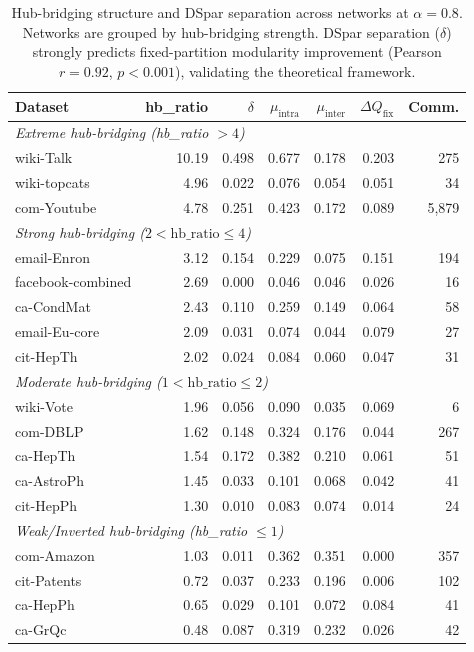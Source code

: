 \documentclass[10pt,journal,compsoc]{IEEEtran}
\begin{document}
\begin{table}[t]
\centering
\caption{Hub-bridging structure and DSpar separation across networks at $\alpha=0.8$. 
Networks are grouped by hub-bridging strength. 
DSpar separation ($\delta$) strongly predicts fixed-partition modularity improvement 
(Pearson $r = 0.92$, $p < 0.001$), validating the theoretical framework.}
\label{tab:hub_bridge_validation}
\begin{tabular}{lrrrrrr}
\toprule
Dataset & hb\_ratio & $\delta$ & $\mu_{\text{intra}}$ & $\mu_{\text{inter}}$ & $\Delta Q_{\text{fix}}$ & Comm. \\
\midrule
\multicolumn{7}{l}{\textit{Extreme hub-bridging (hb\_ratio $> 4$)}} \\
wiki-Talk & 10.19 & 0.498 & 0.677 & 0.178 & 0.203 & 275 \\
wiki-topcats & 4.96 & 0.022 & 0.076 & 0.054 & 0.051 & 34 \\
com-Youtube & 4.78 & 0.251 & 0.423 & 0.172 & 0.089 & 5,879 \\
\midrule
\multicolumn{7}{l}{\textit{Strong hub-bridging ($2 < \text{hb\_ratio} \leq 4$)}} \\
email-Enron & 3.12 & 0.154 & 0.229 & 0.075 & 0.151 & 194 \\
facebook-combined & 2.69 & 0.000 & 0.046 & 0.046 & 0.026 & 16 \\
ca-CondMat & 2.43 & 0.110 & 0.259 & 0.149 & 0.064 & 58 \\
email-Eu-core & 2.09 & 0.031 & 0.074 & 0.044 & 0.079 & 27 \\
cit-HepTh & 2.02 & 0.024 & 0.084 & 0.060 & 0.047 & 31 \\
\midrule
\multicolumn{7}{l}{\textit{Moderate hub-bridging ($1 < \text{hb\_ratio} \leq 2$)}} \\
wiki-Vote & 1.96 & 0.056 & 0.090 & 0.035 & 0.069 & 6 \\
com-DBLP & 1.62 & 0.148 & 0.324 & 0.176 & 0.044 & 267 \\
ca-HepTh & 1.54 & 0.172 & 0.382 & 0.210 & 0.061 & 51 \\
ca-AstroPh & 1.45 & 0.033 & 0.101 & 0.068 & 0.042 & 41 \\
cit-HepPh & 1.30 & 0.010 & 0.083 & 0.074 & 0.014 & 24 \\
\midrule
\multicolumn{7}{l}{\textit{Weak/Inverted hub-bridging (hb\_ratio $\leq 1$)}} \\
com-Amazon & 1.03 & 0.011 & 0.362 & 0.351 & 0.000 & 357 \\
cit-Patents & 0.72 & 0.037 & 0.233 & 0.196 & 0.006 & 102 \\
ca-HepPh & 0.65 & 0.029 & 0.101 & 0.072 & 0.084 & 41 \\
ca-GrQc & 0.48 & 0.087 & 0.319 & 0.232 & 0.026 & 42 \\
\bottomrule
\end{tabular}
\end{table}
\end{document}
